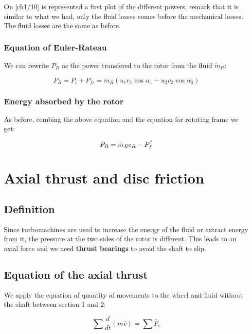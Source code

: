 On \autoref{ch1/10} is represented a first plot of the different powers, remark that it is similar to what we had, only the fluid losses comes before the mechanical losses. The fluid losses are the same as before. 


\subsubsection{Equation of Euler-Rateau}
We can rewrite $P_R$ as the power transfered to the rotor from the fluid $\dot{m}_R$: 

\begin{equation}
P_R = P_i + P_{fr} = \dot{m} _R (u_1v_1\cos \alpha _1 - u_2v_2\cos \alpha _2) 
\end{equation}

\subsubsection{Energy absorbed by the rotor}
As before, combing the above equation and the equation for rotating frame we get: 

\begin{equation}
P_R = \dot{m}_R e_R - P^"_f
\end{equation}


\section{Axial thrust and disc friction}
\subsection{Definition}
Since turbomachines are used to increase the energy of the fluid or extract energy from it, the pressure at the two sides of the rotor is different. This leads to an axial force and we need \textbf{thrust bearings} to avoid the shaft to slip. 

\subsection{Equation of the axial thrust}
We apply the equation of quantity of movements to the wheel and fluid without the shaft between section 1 and 2: 

\begin{equation}
\sum \frac{d}{dt}(m\bar{v}) = \sum \bar{F}_e
\end{equation}

